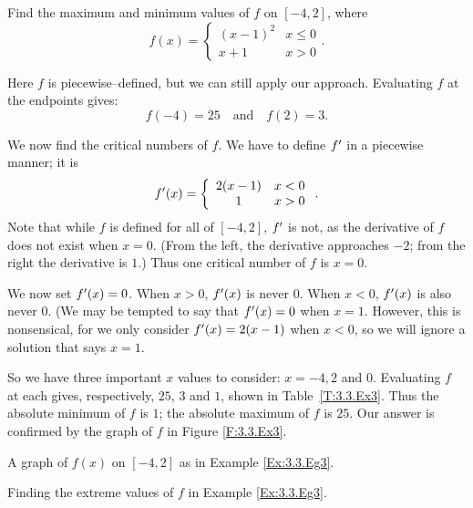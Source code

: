 \begin{example} \label{Ex:3.3.Eg3}
Find the maximum and minimum values of $f$ on $[-4,2]$, where $$f(x) = \left\{\begin{array}{cc} (x-1)^2 & x\leq 0 \\ x+1 & x>0 \end{array}\right. .$$

\solution
Here $f$ is piecewise--defined, but we can still apply our approach. Evaluating $f$ at the endpoints gives: 
$$ f(-4) = 25 \quad \text{and} \quad f(2) = 3.$$

We now find the critical numbers of $f$. We have to define $f'$ in a piecewise manner; it is $$f'(x) =\left\{\begin{array}{cc} 2(x-1) & x < 0 \\ 1 & x>0 \end{array}\right. .$$ Note that while $f$ is defined for all of $[-4,2]$, $f'$ is not, as the derivative of $f$ does not exist when $x=0$. (From the left, the derivative approaches $-2$; from the right the derivative is $1$.) Thus one critical number of $f$ is $x=0$.

We now set $f'(x) = 0$. When $x >0$, $f'(x)$ is never $0$.  When $x<0$, $f'(x)$ is also never $0$. (We may be tempted to say that $f'(x) = 0 $ when $x=1$. However, this is nonsensical, for we only consider $f'(x) = 2(x-1)$ when $x<0$, so we will ignore a solution that says $x=1$. 

So we have three important $x$ values to consider: $x= -4, 2$ and $0$. Evaluating $f$ at each gives, respectively, $25$, $3$ and $1$, shown in Table~\ref{T:3.3.Ex3}. Thus the absolute minimum of $f$ is $1$; the absolute maximum of $f$ is $25$. Our answer is confirmed by the graph of $f$ in Figure \ref{F:3.3.Ex3}.
\end{example}

\begin{marginfigure}[-18cm]
\caption{A graph of $f(x)$ on $[-4,2]$ as in Example \ref{Ex:3.3.Eg3}. } \label{F:3.3.Ex3}
\end{marginfigure}

\begin{margintable}[-6cm]
\begin{center}
\end{center}
\caption{Finding the extreme values of $f$ in Example \ref{Ex:3.3.Eg3}.} \label{T:3.3.Ex3}
\end{margintable}